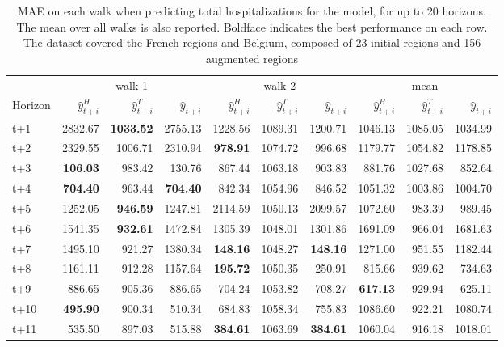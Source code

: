 \begin{table}[H]
\centering
\caption{MAE on each walk when predicting total hospitalizations for the model, for up to 20 horizons. The mean over all walks is also reported. Boldface indicates the best performance on each row. The dataset covered the French regions and Belgium, composed of 23 initial regions and 156 augmented regions }
\label{tab:MAE_walk_assemble}
\begin{tabular}{lrrrrrrrrr}
\toprule
 & \multicolumn{3}{c}{walk 1} & \multicolumn{3}{c}{walk 2} & \multicolumn{3}{c}{mean} 
\\

\cmidrule(lr){2-4} \cmidrule(lr){5-7} \cmidrule(lr){8-10} 
Horizon & $\hat{y}_{t+i}^H$ & $\hat{y}_{t+i}^T$ & $\hat{y}_{t+i}$ & $\hat{y}_{t+i}^H$ & $\hat{y}_{t+i}^T$ & $\hat{y}_{t+i}$ & $\hat{y}_{t+i}^H$ & $\hat{y}_{t+i}^T$ & $\hat{y}_{t+i}$ \\
\midrule
t+1  & 2832.67  & \textbf{1033.52}  & 2755.13  & 1228.56  & 1089.31  & 1200.71  & 1046.13  & 1085.05  & 1034.99  \\
t+2  & 2329.55  & 1006.71  & 2310.94  & \textbf{978.91}  & 1074.72  & 996.68  & 1179.77  & 1054.82  & 1178.85  \\
t+3  & \textbf{106.03}  & 983.42  & 130.76  & 867.44  & 1063.18  & 903.83  & 881.76  & 1027.68  & 852.64  \\
t+4  & \textbf{704.40}  & 963.44  & \textbf{704.40}  & 842.34  & 1054.96  & 846.52  & 1051.32  & 1003.86  & 1004.70  \\
t+5  & 1252.05  & \textbf{946.59}  & 1247.81  & 2114.59  & 1050.13  & 2099.57  & 1072.60  & 983.39  & 989.45  \\
t+6  & 1541.35  & \textbf{932.61}  & 1472.84  & 1305.39  & 1048.01  & 1301.86  & 1691.09  & 966.04  & 1681.63  \\
t+7  & 1495.10  & 921.27  & 1380.34  & \textbf{148.16}  & 1048.27  & \textbf{148.16}  & 1271.00  & 951.55  & 1182.44  \\
t+8  & 1161.11  & 912.28  & 1157.64  & \textbf{195.72}  & 1050.35  & 250.91  & 815.66  & 939.62  & 734.63  \\
t+9  & 886.65  & 905.36  & 886.65  & 704.24  & 1053.82  & 708.27  & \textbf{617.13}  & 929.94  & 625.11  \\
t+10  & \textbf{495.90}  & 900.34  & 510.34  & 684.83  & 1058.34  & 755.83  & 1086.60  & 922.21  & 1080.74  \\
t+11  & 535.50  & 897.03  & 515.88  & \textbf{384.61}  & 1063.69  & \textbf{384.61}  & 1060.04  & 916.18  & 1018.01  \\

\end{tabular}
\end{table}

